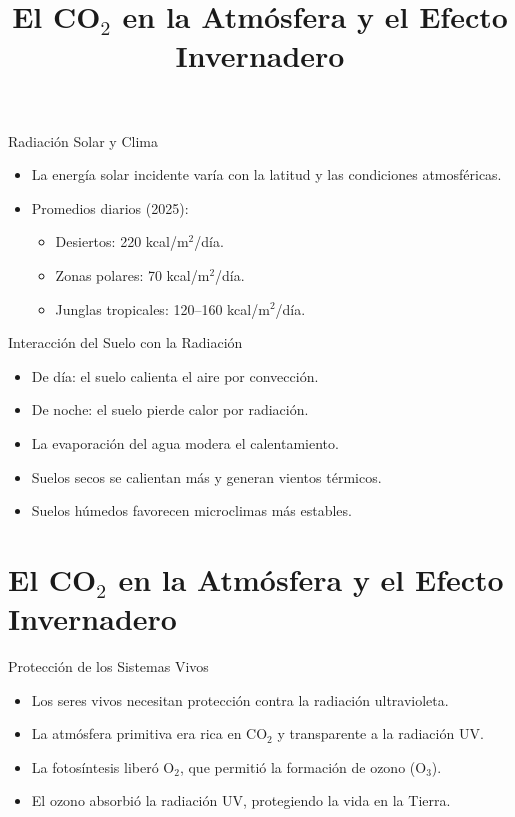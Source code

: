 \documentclass[main.tex]{subfiles}
\begin{document}
\begin{frame}{Radiación Solar y Clima}
  \begin{itemize}
    \item La energía solar incidente varía con la latitud y las condiciones atmosféricas.
    \item Promedios diarios (2025):
    \begin{itemize}
      \item Desiertos: 220 kcal/m$^2$/día.
      \item Zonas polares: 70 kcal/m$^2$/día.
      \item Junglas tropicales: 120–160 kcal/m$^2$/día.
    \end{itemize}
  \end{itemize}
\end{frame}

\begin{frame}{Interacción del Suelo con la Radiación}
  \begin{itemize}
    \item De día: el suelo calienta el aire por convección.
    \item De noche: el suelo pierde calor por radiación.
    \item La evaporación del agua modera el calentamiento.
    \item Suelos secos se calientan más y generan vientos térmicos.
    \item Suelos húmedos favorecen microclimas más estables.
  \end{itemize}
\end{frame}



\section{El \texorpdfstring{CO$_2$}{CO2} en la Atmósfera y el Efecto Invernadero}
\title{El CO$_2$ en la Atmósfera y el Efecto Invernadero}
\begin{frame}{Protección de los Sistemas Vivos}
    \begin{itemize}
        \item Los seres vivos necesitan protección contra la radiación ultravioleta.
        \item La atmósfera primitiva era rica en CO$_2$ y transparente a la radiación UV.
        \item La fotosíntesis liberó O$_2$, que permitió la formación de ozono (O$_3$).
        \item El ozono absorbió la radiación UV, protegiendo la vida en la Tierra.
    \end{itemize}
\end{frame}
\end{document}
